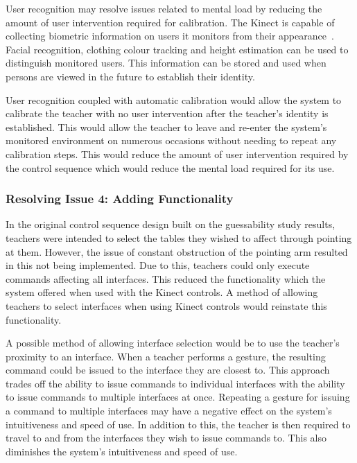 \documentclass[link]{IWCOMP}
\begin{document}
User recognition may resolve issues related to mental load by reducing the amount of user intervention required for calibration.
The Kinect is capable of collecting biometric information on users it monitors from their appearance~\cite{Leyvand2011}.
Facial recognition, clothing colour tracking and height estimation can be used to distinguish monitored users.
This information can be stored and used when persons are viewed in the future to establish their identity.

User recognition coupled with automatic calibration would allow the system to calibrate the teacher with no user intervention after the teacher's identity is established.
This would allow the teacher to leave and re-enter the system's monitored environment on numerous occasions without needing to repeat any calibration steps.
This would reduce the amount of user intervention required by the control sequence which would reduce the mental load required for its use.

\subsubsection{Resolving Issue 4: Adding Functionality}
\label{subsubsec:studyResolvingIssues4}

In the original control sequence design built on the guessability study results, teachers were intended to select the tables they wished to affect through pointing at them.
However, the issue of constant obstruction of the pointing arm resulted in this not being implemented.
Due to this, teachers could only execute commands affecting all interfaces.
This reduced the functionality which the system offered when used with the Kinect controls.
A method of allowing teachers to select interfaces when using Kinect controls would reinstate this functionality.

A possible method of allowing interface selection would be to use the teacher's proximity to an interface.
When a teacher performs a gesture, the resulting command could be issued to the interface they are closest to.
This approach trades off the ability to issue commands to individual interfaces with the ability to issue commands to multiple interfaces at once.
Repeating a gesture for issuing a command to multiple interfaces may have a negative effect on the system's intuitiveness and speed of use.
In addition to this, the teacher is then required to travel to and from the interfaces they wish to issue commands to.
This also diminishes the system's intuitiveness and speed of use.
\end{document}
